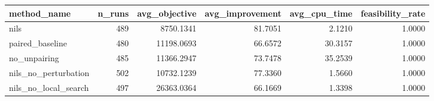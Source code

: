 \begin{tabular}{lrrrrr}
\toprule
method_name & n_runs & avg_objective & avg_improvement & avg_cpu_time & feasibility_rate \\
\midrule
nils & 489 & 8750.1341 & 81.7051 & 2.1210 & 1.0000 \\
paired_baseline & 480 & 11198.0693 & 66.6572 & 30.3157 & 1.0000 \\
no_unpairing & 485 & 11366.2947 & 73.7478 & 35.2539 & 1.0000 \\
nils_no_perturbation & 502 & 10732.1239 & 77.3360 & 1.5660 & 1.0000 \\
nils_no_local_search & 497 & 26363.0364 & 66.1669 & 1.3398 & 1.0000 \\
\bottomrule
\end{tabular}
